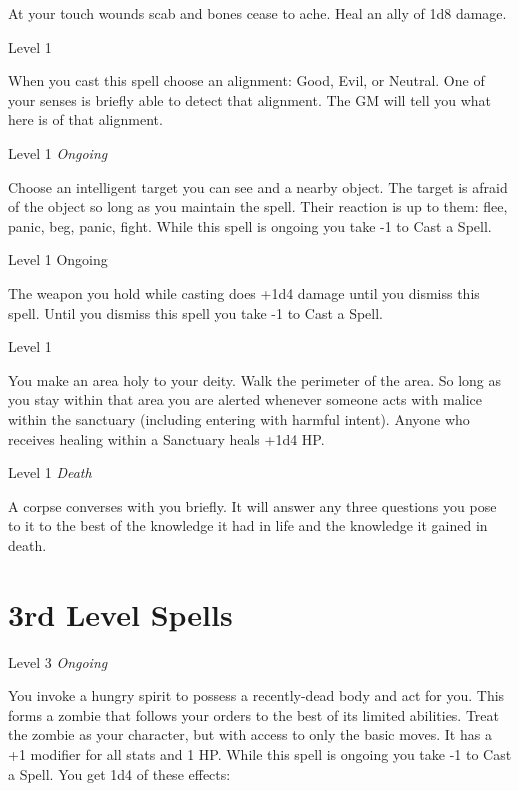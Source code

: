 At your touch wounds scab and bones cease to ache. Heal an ally of 1d8 damage.

 
\startSpellName
{} 	Level 1
\stopSpellName
 

When you cast this spell choose an alignment: Good, Evil, or Neutral. One of your senses is briefly able to detect that alignment. The GM will tell you what here is of that alignment.

 
\startSpellName
{} 	Level 1	{\em Ongoing} 
\stopSpellName
 

Choose an intelligent target you can see and a nearby object. The target is afraid of the object so long as you maintain the spell. Their reaction is up to them: flee, panic, beg, panic, fight. While this spell is ongoing you take -1 to Cast a Spell.

 
\startSpellName
{} 	Level 1	 Ongoing
\stopSpellName
 

The weapon you hold while casting does +1d4 damage until you dismiss this spell. Until you dismiss this spell you take -1 to Cast a Spell.

 
\startSpellName
{} 	Level 1
\stopSpellName
 

You make an area holy to your deity. Walk the perimeter of the area. So long as you stay within that area you are alerted whenever someone acts with malice within the sanctuary (including entering with harmful intent). Anyone who receives healing within a Sanctuary heals +1d4 HP.

 
\startSpellName
{} 	Level 1	{\em Death} 
\stopSpellName
 

A corpse converses with you briefly. It will answer any three questions you pose to it to the best of the knowledge it had in life and the knowledge it gained in death.



 


\section{3rd Level Spells}     
 
\startSpellName
{} 	Level 3	{\em Ongoing} 
\stopSpellName
 

You invoke a hungry spirit to possess a recently-dead body and act for you. This forms a zombie that follows your orders to the best of its limited abilities. Treat the zombie as your character, but with access to only the basic moves. It has a +1 modifier for all stats and 1 HP. While this spell is ongoing you take -1 to Cast a Spell. You get 1d4 of these effects:

